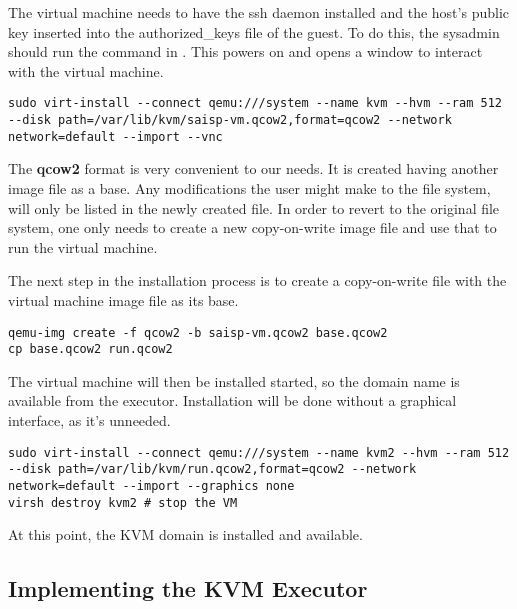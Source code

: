The virtual machine needs to have the ssh daemon installed and the host's
public key inserted into the authorized_keys file of the guest. To do this,
the sysadmin should run the command in .
This powers on and opens a window to interact with the virtual machine.

\lstset{caption=Initial run of the virtual machine, label=lst:kvm-run}
\begin{lstlisting}
sudo virt-install --connect qemu:///system --name kvm --hvm --ram 512 --disk path=/var/lib/kvm/saisp-vm.qcow2,format=qcow2 --network network=default --import --vnc
\end{lstlisting}

The {\bf qcow2} format is very convenient to our needs. It is created having
another image file as a base. Any modifications the user might make to the
file system, will only be listed in the newly created file. In order to
revert to the original file system, one only needs to create a new
copy-on-write image file and use that to run the virtual machine.

The next step in the installation process is to create a copy-on-write file 
with the virtual machine image file as its base.

\lstset{caption=Creating the Target File, label=lst:kvm-base}
\begin{lstlisting}
qemu-img create -f qcow2 -b saisp-vm.qcow2 base.qcow2
cp base.qcow2 run.qcow2
\end{lstlisting}

The virtual machine will then be installed started, so the domain name is available
from the executor. Installation will be done without a graphical interface, 
as it's unneeded.


\lstset{caption=Install the KVM Domain, label=lst:kvm-install}
\begin{lstlisting}
sudo virt-install --connect qemu:///system --name kvm2 --hvm --ram 512 --disk path=/var/lib/kvm/run.qcow2,format=qcow2 --network network=default --import --graphics none
virsh destroy kvm2 # stop the VM
\end{lstlisting}

At this point, the KVM domain is installed and available.

\subsection{Implementing the KVM Executor}
\label{sub-sec:vmc-kvm-executor}

